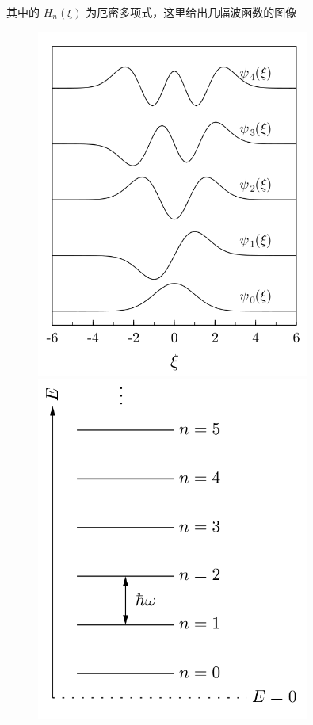 \documentclass{article}
\begin{document}
其中的 $\displaystyle H_n(\xi)$ 为厄密多项式，这里给出几幅波函数的图像
\begin{figure}[hbpt]
    \begin{minipage}{0.45\textwidth}
        \centering
        \includegraphics[width = 0.8\textwidth]{figure/一维简单谐振子解.png}
    \end{minipage}
    \hfill
    \begin{minipage}{0.45\textwidth}
        \centering
        \includegraphics[width = 0.8\textwidth]{figure/一维简单谐振子能谱.png}
    \end{minipage}
\end{figure}
\end{document}
